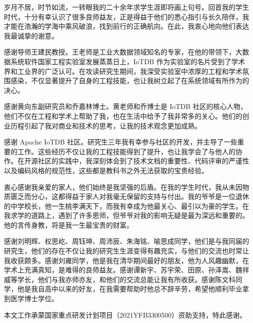 
\begin{acknowledgements}
岁月不居，时节如流，一转眼我的二十余年求学生涯即将画上句号。回首我的学生时代，十分有幸认识了很多良师益友，正是得益于他们的悉心指引与长久陪伴，我才能在浩瀚的学海中乘风破浪，找到前行的正确航向。在此，我衷心地向他们表达我最诚挚的谢意。

感谢导师王建民教授。王老师是工业大数据领域知名的专家，在他的带领下，大数据系统软件国家工程实验室发展蒸蒸日上，IoTDB 作为实验室的名片受到了学术界和工业界的广泛认可。在攻读研究生期间，我深受实验室中浓厚的工程和学术氛围感染，不仅显著提升了自身的工程技能，也让我树立起了在系统领域有所作为的决心。

感谢黄向东副研究员和乔嘉林博士。黄老师和乔博士是 IoTDB 社区的核心人物，他们不仅在工程和学术上帮助了我，也在生活中给予了我非常多的关心。他们的创业历程引起了我对商业和技术的思考，让我的技术观念更加成熟。

感谢 Apache IoTDB 社区。研究生三年我有幸参与社区的开发，并主导了一些重要的工作。这些经历不仅让我的工程技能得到了提升，也让我学会了与他人的协作。在开源社区的实践中，我深刻体会到了技术文档的重要性、代码评审的严谨性以及编码风格的规范性，这些都是教科书之外无法获取的宝贵经验。

衷心感谢我亲爱的家人，他们始终是我坚强的后盾。在我的学生时代，我从未因物质匮乏而分心，这都得益于家人对我毫无保留的支持与付出。我的爷爷是一位退休的中学校长，他一生桃李满天下，而我有幸成为他最关心、最引以为豪的学生。在我求学的道路上，遇到了许多恩师，但爷爷对我的影响无疑是最为深远和重要的。他的言传身教，将是我一生最宝贵的财富。

感谢刘明辉、权思屹、周钰坤、周沛辰、朱海铭、喻思成同学，他们是与我同届的研究生，他们的存在不仅让我的研究生生涯变得有趣充实，与他们的交流也时常让我收获颇多。感谢刘雍同学，他是我在清华期间最好的朋友，他为人风趣幽默，在学术上充满真知，是难得的良师益友。感谢谭新宇、苏宇荣、田原、孙泽嵩、魏祥威等学长，他们与我亦师亦友，和他们的交流总能让我有所收获。感谢陈文科同学，他是我自高中以来的好友，在我需要帮助时他总不辞辛劳，希望他顺利毕业拿到医学博士学位。

本文工作承蒙国家重点研发计划项目（2021YFB3300500）资助支持，特此感谢。

\end{acknowledgements}
